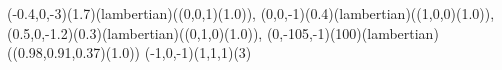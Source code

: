 \documentclass{standalone}
\begin{document}
    \rayimg
    {%
        {(-0.4,0,-3)(1.7)(lambertian)({(0,0,1)(1.0)})},%
        {(0,0,-1)(0.4)(lambertian)({(1,0,0)(1.0)})},%
        {(0.5,0,-1.2)(0.3)(lambertian)({(0,1,0)(1.0)})},%
        {(0,-105,-1)(100)(lambertian)({(0.98,0.91,0.37)(1.0)})}%
    }%
    {%
        (-1,0,-1)(1,1,1)(3)%
    }%
\end{document}
